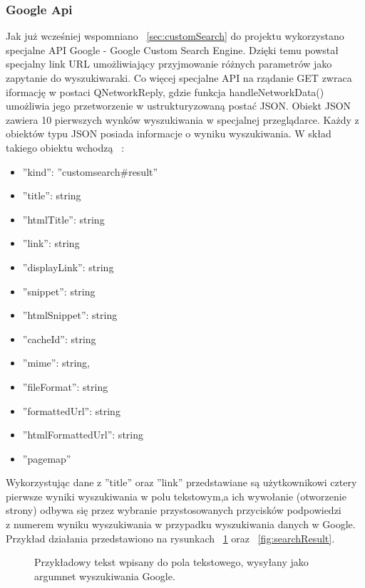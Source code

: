 \documentclass[twoside,a4paper]{book}
\begin{document}
\subsubsection{Google Api}
Jak już wcześniej wspomniano ~\ref{sec:customSearch} do projektu wykorzystano specjalne API Google - Google Custom Search Engine. Dzięki temu powstał specjalny link URL umożliwiający przyjmowanie różnych parametrów jako zapytanie do wyszukiwaraki. Co więcej specjalne API na rządanie GET zwraca iformację w postaci QNetworkReply, gdzie funkcja handleNetworkData() umożliwia jego przetworzenie w ustrukturyzowaną postać JSON. Obiekt JSON zawiera 10 pierwszych wynków wyszukiwania w specjalnej przeglądarce. Każdy z obiektów typu JSON posiada informacje o wyniku wyszukiwania. W skład takiego obiektu wchodzą ~\cite{googleJSON}:
\begin{itemize}
\item ''kind'': ''customsearch\#result''
\item ''title'': string
\item ''htmlTitle'': string
\item ''link'': string
\item ''displayLink'': string
\item ''snippet'': string
\item ''htmlSnippet'': string
\item  ''cacheId'': string
\item ''mime'': string,
\item ''fileFormat'': string
\item ''formattedUrl'': string
\item ''htmlFormattedUrl'': string
\item ''pagemap''
\end{itemize} 
Wykorzystując dane z ''title'' oraz ''link'' przedstawiane są użytkownikowi cztery pierwsze wyniki wyszukiwania w polu tekstowym,a ich wywołanie (otworzenie strony) odbywa się przez wybranie przystosowanych przycisków podpowiedzi \\z numerem wyniku wyszukiwania w przypadku wyszukiwania danych w Google. Przykład działania przedstawiono na rysunkach ~\ref{fig:googleSearch} oraz ~\ref{fig:searchResult}. 
			\begin{figure}[!h]
		\centering
		\caption{Przykładowy tekst wpisany do pola tekstowego, wysyłany jako argumnet wyszukiwania Google.}
		\label{fig:googleSearch}
		\end{figure}
\end{document}
